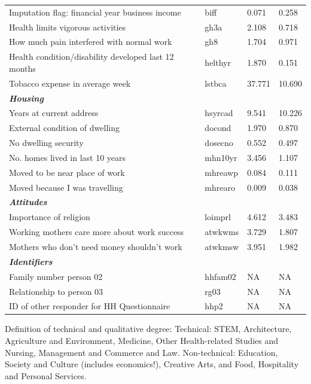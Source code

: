 \documentclass[12pt, a4paper]{article}
\begin{document}
\begin{landscape}
\begin{longtable}{p{} C{0.2\textwidth} C{0.2\textwidth} C{0.2\textwidth}}
Imputation flag: financial year business income 	& 	biff	 & 	0.071	 & 	0.258	 \\
Health limits vigorous activities 	& 	gh3a	 & 	2.108	 & 	0.718	 \\
How much pain interfered with normal work 	& 	gh8	 & 	1.704	 & 	0.971	 \\
Health condition/disability developed last 12 months 	& 	helthyr	 & 	1.870	 & 	0.151	 \\
Tobacco expense in average week 	& 	lstbca	 & 	37.771	 & 	10.690	 \\
\textbf{\textit{Housing}} 	& 		 & 		 & 		 \\
Years at current address 	& 	hsyrcad	 & 	9.541	 & 	10.226	 \\
External condition of dwelling 	& 	docond	 & 	1.970	 & 	0.870	 \\
No dwelling security 	& 	dosecno	 & 	0.552	 & 	0.497	 \\
No.  homes lived in last 10 years 	& 	mhn10yr	 & 	3.456	 & 	1.107	 \\
Moved to be near place of work 	& 	mhreawp	 & 	0.084	 & 	0.111	 \\
Moved because I was travelling	& 	mhrearo	 & 	0.009	 & 	0.038	 \\
\textbf{\textit{Attitudes}} 	& 		 & 		 & 		 \\
Importance of religion 	& 	loimprl	 & 	4.612	 & 	3.483	 \\
Working mothers care more about work success 	& 	atwkwms	 & 	3.729	 & 	1.807	 \\
Mothers who don't need money shouldn't work 	& 	atwkmsw	 & 	3.951	 & 	1.982	 \\
\textbf{\textit{Identifiers}} 	& 		 & 		 & 		 \\
Family number person 02 	& 	hhfam02	 & 	NA	 & 	NA	 \\
Relationship to person 03 	& 	rg03	 & 	NA	 & 	NA	 \\
ID of other responder for HH Questionnaire 	& 	hhp2	 & 	NA	 & 	NA
\label{tab:sumstats}
\end{longtable}  
\parbox{1.5\textwidth}{\footnotesize *Definition of technical and qualitative degree: Technical: STEM, Architecture, Agriculture and Environment, Medicine, Other Health-related Studies and Nursing, Management and Commerce and Law. Non-technical: Education, Society and Culture (includes economics!), Creative Arts, and Food, Hospitality and Personal Services. }\\  



\end{landscape}
\end{document}
